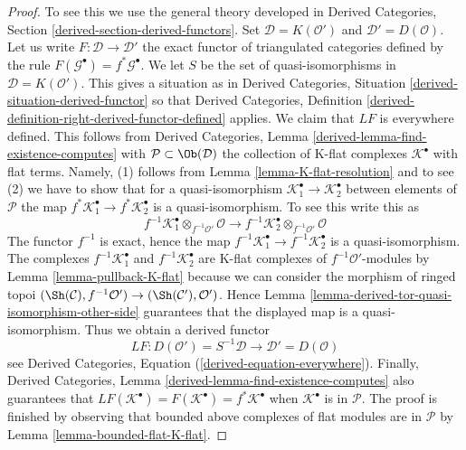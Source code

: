 \begin{proof}
To see this we use the general theory developed in
Derived Categories, Section \ref{derived-section-derived-functors}.
Set $\mathcal{D} = K(\mathcal{O}')$ and $\mathcal{D}' = D(\mathcal{O})$.
Let us write $F : \mathcal{D} \to \mathcal{D}'$ the exact functor
of triangulated categories defined by the rule
$F(\mathcal{G}^\bullet) = f^*\mathcal{G}^\bullet$.
We let $S$ be the set of quasi-isomorphisms in
$\mathcal{D} = K(\mathcal{O}')$.
This gives a situation as in
Derived Categories, Situation \ref{derived-situation-derived-functor}
so that
Derived Categories, Definition
\ref{derived-definition-right-derived-functor-defined}
applies. We claim that $LF$ is everywhere defined.
This follows from
Derived Categories, Lemma \ref{derived-lemma-find-existence-computes}
with $\mathcal{P} \subset \Ob(\mathcal{D})$ the collection
of K-flat complexes $\mathcal{K}^\bullet$ with flat terms.
Namely, (1) follows from Lemma \ref{lemma-K-flat-resolution}
and to see (2) we have to show that for a quasi-isomorphism
$\mathcal{K}_1^\bullet  \to \mathcal{K}_2^\bullet$ between
elements of $\mathcal{P}$ the map
$f^*\mathcal{K}_1^\bullet  \to f^*\mathcal{K}_2^\bullet$ is a
quasi-isomorphism. To see this write this as
$$
f^{-1}\mathcal{K}_1^\bullet \otimes_{f^{-1}\mathcal{O}'} \mathcal{O}
\longrightarrow
f^{-1}\mathcal{K}_2^\bullet \otimes_{f^{-1}\mathcal{O}'} \mathcal{O}
$$
The functor $f^{-1}$ is exact, hence the map
$f^{-1}\mathcal{K}_1^\bullet  \to f^{-1}\mathcal{K}_2^\bullet$ is a
quasi-isomorphism. The complexes
$f^{-1}\mathcal{K}_1^\bullet$ and $f^{-1}\mathcal{K}_2^\bullet$
are K-flat complexes of $f^{-1}\mathcal{O}'$-modules by
Lemma \ref{lemma-pullback-K-flat}
because we can consider the morphism of ringed topoi
$(\Sh(\mathcal{C}), f^{-1}\mathcal{O}') \to
(\Sh(\mathcal{C}'), \mathcal{O}')$. Hence
Lemma \ref{lemma-derived-tor-quasi-isomorphism-other-side}
guarantees that the displayed map is a quasi-isomorphism.
Thus we obtain a derived functor
$$
LF :
D(\mathcal{O}') = S^{-1}\mathcal{D}
\longrightarrow
\mathcal{D}' = D(\mathcal{O})
$$
see
Derived Categories, Equation (\ref{derived-equation-everywhere}).
Finally,
Derived Categories, Lemma \ref{derived-lemma-find-existence-computes}
also guarantees that
$LF(\mathcal{K}^\bullet) = F(\mathcal{K}^\bullet) = f^*\mathcal{K}^\bullet$
when $\mathcal{K}^\bullet$ is in $\mathcal{P}$.
The proof is finished by observing that
bounded above complexes of flat modules are in $\mathcal{P}$
by Lemma \ref{lemma-bounded-flat-K-flat}.
\end{proof}


